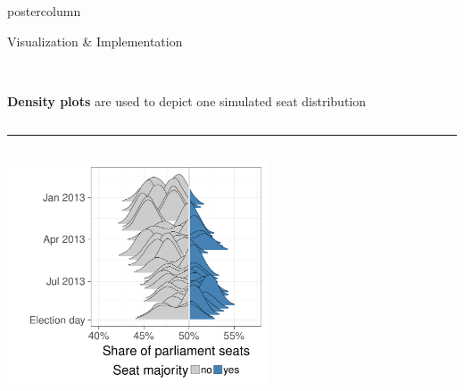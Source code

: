 \documentclass[final,hyperref={pdfpagelabels=false}]{beamer}
\begin{document}
\begin{frame}
\begin{columns}
\begin{column}{1\textwidth}
\begin{columns}[T]
\begin{column}{.484\textwidth}
\begin{beamercolorbox}[center,wd=\textwidth]{postercolumn}
\begin{minipage}[T]{.95\textwidth}
\begin{block}{\footnotesize Visualization \& Implementation}
\begin{columns}[t]
  \begin{column}{.65\textwidth}
  \ \\
  \textbf{Density plots} are used to depict one simulated seat distribution
  \end{column}
\end{columns}
\vspace{1ex}
\textcolor{LMUlightgray}{\hrule{}}
\vspace{1ex}
\begin{columns}[t]
  \begin{column}{.3\textwidth}
  \begin{center}\centering
  \includegraphics[height=250px]{figures/vis_seatDist_time}
  \end{center}
  \end{column}

  \hspace{-1.5ex}
  \textcolor{LMUlightgray}{\vrule{}}
  \hspace{1.5ex}


\end{columns}
\end{block}
\end{minipage}
\end{beamercolorbox}
\end{column}
\end{columns}
\end{column}
\end{columns}
\end{frame}
\end{document}
